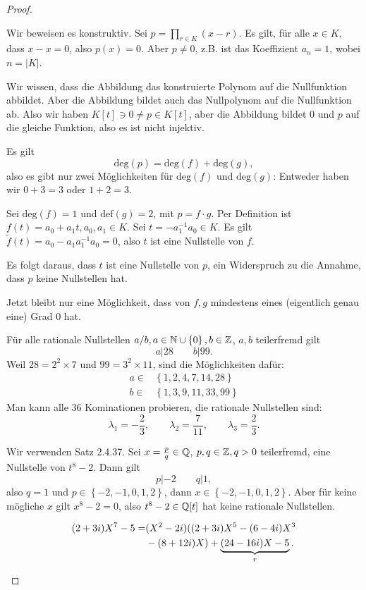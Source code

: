 \begin{proof}
	\begin{parts}
	\item Wir beweisen es konstruktiv. Sei $p=\prod_{r\in K} (x-r)  $. Es gilt, f\"{u}r alle $x\in K$, dass $x-x=0$, also $p(x)=0$. Aber $p\neq 0$, z.B. ist das Koeffizient $a_n=1$, wobei $n=|K|$.

		Wir wissen, dass die Abbildung das konstruierte Polynom auf die Nullfunktion abbildet. Aber die Abbildung bildet auch das Nullpolynom auf die Nullfunktion ab. Also wir haben $K[t]\ni 0 \neq p\in K[t]$, aber die Abbildung bildet $0$ und $p$ auf die gleiche Funktion, also es ist nicht injektiv.
	\item Es gilt
		\[
			\text{deg}(p)=\text{deg}(f)+\text{deg}(g)
		,\]
		also es gibt nur zwei Möglichkeiten f\"{u}r $\text{deg}(f)$ und $\text{deg}(g)$: Entweder haben wir $0+3=3$ oder $1+2=3$. 

		Sei $ \text{deg}(f)=1$ und $\text{def}(g)=2$, mit $p=f\cdot g$. Per Definition ist $f(t)=a_0+a_1t,a_0,a_1\in K$. Sei $t=-a_1^{-1}a_0\in K$. Es gilt $\tilde{f}(t)=a_0-a_1a_1^{-1}a_0=0$, also $ t$ ist eine Nullstelle von $f$. 

		Es folgt daraus, dass $t$ ist eine Nullstelle von $p$, ein Widerspruch zu die Annahme, dass $p$ keine Nullstellen hat.

		Jetzt bleibt nur eine Möglichkeit, dass von $f,g$ mindestens eines (eigentlich genau eine) Grad $0$ hat.
	\item F\"{u}r alle rationale Nullstellen $a / b, a\in \mathbb{N}\cup \left\{ 0 \right\} , b\in \mathbb{Z}$, $a,b$ teilerfremd gilt 
		\[
		a|28\qquad b|99
		.\] 
		Weil $28=2^2\times 7$ und $99=3^2\times 11$, sind die Möglichkeiten dafür:
		\begin{align*}
			a\in& \left\{1,2,4,7,14, 28 \right\} \\
			b\in& \left\{ 1,3,9,11,33,99 \right\} 
		\end{align*}
		Man kann alle $36$ Kominationen probieren, die rationale Nullstellen sind:
		\[
		\lambda_1=-\frac{2}{3}, \qquad \lambda_2=\frac{7}{11},\qquad \lambda_3=\frac{2}{3}
		.\] 
	\item Wir verwenden Satz 2.4.37. Sei $x=\frac{p}{q}\in \mathbb{Q}$, $p,q\in \mathbb{Z}, q >0$ teilerfremd, eine Nullstelle von $t^8-2$. Dann gilt
		\[
		p|-2\qquad q|1
		,\] 
		also $q=1$ und $p\in\left\{ -2,-1,0,1,2 \right\} $, dann $x\in \left\{ -2,-1,0,1,2 \right\} $. Aber f\"{u}r keine mögliche $x$ gilt $x^8-2=0$, also $t^8-2\in \mathbb{Q}[t]$ hat keine rationale Nullstellen.
	\item 
		\begin{align*}
			(2+3i)X^7-5=&(X^2-2i)((2+3i)X^5-(6-4i)X^3\\&-(8+12i)X)+\underbrace{(24-16i)X-5}_r.\qedhere
		\end{align*}
	\end{parts}
\end{proof}
